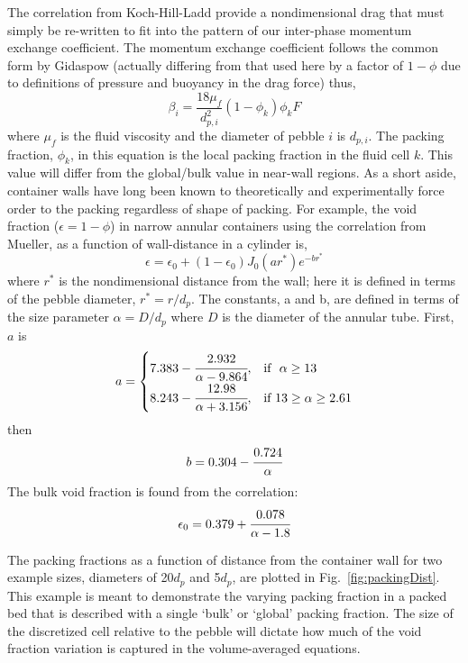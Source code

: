 The correlation from Koch-Hill-Ladd provide a nondimensional drag that must simply be re-written to fit into the pattern of our inter-phase momentum exchange coefficient. The momentum exchange coefficient follows the common form by Gidaspow\cite{gidaspow1994multiphase} (actually differing from that used here by a factor of $1-\phi$ due to definitions of pressure and buoyancy in the drag force) thus,\cite{Hoef2005,Benyahia2006}
\begin{equation}\label{eq:interphase-momentum}
	\beta_{i} = \frac{18\mu_f}{d_{p,i}^2}(1-\phi_k)\phi_k F
\end{equation}
where $\mu_f$ is the fluid viscosity and the diameter of pebble $i$ is $d_{p,i}$. The packing fraction, $\phi_k$, in this equation is the local packing fraction in the fluid cell $k$. This value will differ from the global/bulk value in near-wall regions. As a short aside, container walls have long been known to theoretically and experimentally force order to the packing regardless of shape of packing.\cite{Hunt1990,Benenati1962,Baird1958} For example, the void fraction ($\epsilon = 1-\phi$) in narrow annular containers using the correlation from Mueller, as a function of wall-distance in a cylinder is,\cite{Mueller1999}
\[
\epsilon = \epsilon_0 + (1-\epsilon_0)J_0(ar^*)e^{-br^*}
\]
where $r^*$ is the nondimensional distance from the wall; here it is defined in terms of the pebble diameter, $r^* = r/d_p$. The constants, a and b, are defined in terms of the size parameter $\alpha = D/d_p$ where $D$ is the diameter of the annular tube. First, $a$ is
\[
    a= 
\begin{cases}
    7.383 - \cfrac{2.932}{\alpha - 9.864}, & \text{if }\  \alpha \geq 13\\
    8.243 - \cfrac{12.98}{\alpha + 3.156}, & \text{if} \ 13 \geq \alpha \geq 2.61
\end{cases}
\]
then
\[
b = 0.304 - \cfrac{0.724}{\alpha}
\]
The bulk void fraction is found from the correlation:
\[
\epsilon_0 = 0.379 + \cfrac{0.078}{\alpha - 1.8}
\]

The packing fractions as a function of distance from the container wall for two example sizes, diameters of 20$d_p$ and 5$d_p$, are plotted in Fig.~\ref{fig:packingDist}. This example is meant to demonstrate the varying packing fraction in a packed bed that is described with a single `bulk' or `global' packing fraction. The size of the discretized cell relative to the pebble will dictate how much of the void fraction variation is captured in the volume-averaged equations.

